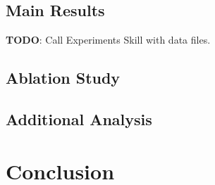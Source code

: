 \documentclass{article}
\begin{document}
\subsection{Main Results}
\label{sec:main}

%

\textbf{TODO}: Call Experiments Skill with data files.

\subsection{Ablation Study}
\label{sec:ablation}


\subsection{Additional Analysis}
\label{sec:analysis}


\section{Conclusion}
\label{sec:conclusion}

%
\end{document}
